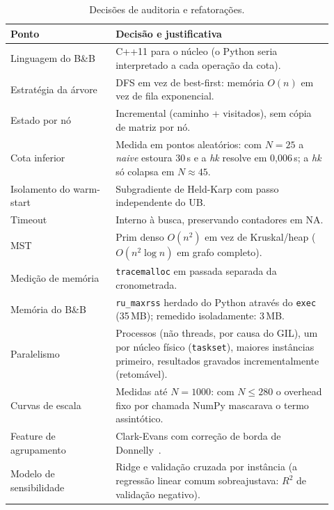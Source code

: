 \documentclass[12pt]{article}
\begin{document}
\begin{table}[ht]
\centering
\caption{Decisões de auditoria e refatorações.}
\label{tab:auditoria}
\small
\begin{tabular}{p{0.3\linewidth}p{0.62\linewidth}}
\toprule
Ponto & Decisão e justificativa \\
\midrule
Linguagem do B\&B & C++11 para o núcleo (o Python seria interpretado a cada operação da cota). \\
Estratégia da árvore & DFS em vez de best-first: memória $O(n)$ em vez de fila exponencial. \\
Estado por nó & Incremental (caminho + visitados), sem cópia de matriz por nó. \\
Cota inferior & Medida em pontos aleatórios: com $N=25$ a \textit{naive} estoura 30\,s e a \textit{hk} resolve em 0{,}006\,s; a \textit{hk} só colapsa em $N\approx45$. \\
Isolamento do warm-start & Subgradiente de Held-Karp com passo independente do UB. \\
Timeout & Interno à busca, preservando contadores em NA. \\
MST & Prim denso $O(n^2)$ em vez de Kruskal/heap ($O(n^2\log n)$ em grafo completo). \\
Medição de memória & \texttt{tracemalloc} em passada separada da cronometrada. \\
Memória do B\&B & \texttt{ru\_maxrss} herdado do Python através do \texttt{exec} (35\,MB); remedido isoladamente: 3\,MB. \\
Paralelismo & Processos (não threads, por causa do GIL), um por núcleo físico (\texttt{taskset}), maiores instâncias primeiro, resultados gravados incrementalmente (retomável). \\
Curvas de escala & Medidas até $N=1000$: com $N \le 280$ o overhead fixo por chamada NumPy mascarava o termo assintótico. \\
Feature de agrupamento & Clark-Evans com correção de borda de Donnelly~\cite{clarkevans1954,donnelly1978}. \\
Modelo de sensibilidade & Ridge e validação cruzada por instância (a regressão linear comum sobreajustava: $R^2$ de validação negativo). \\
\bottomrule
\end{tabular}
\end{table}
\end{document}
